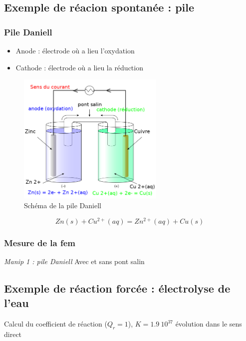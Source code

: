 \documentclass{article}%
\begin{document}
\subsection{Exemple de réacion spontanée : pile}

\subsubsection{Pile Daniell}


\begin{itemize}
	\item Anode : électrode où a lieu l'oxydation

	\item Cathode : électrode où a lieu la réduction
\end{itemize}

\begin{figure}
	\centerline{\includegraphics[width=7cm]{images/pile_Daniell.png}}
	\caption{Schéma de la pile Daniell}
\end{figure}

\[Zn(s) + Cu^{2+}(aq) = Zn^{2+}(aq) + Cu(s)\]

\subsubsection{Mesure de la fem}
\textit{Manip 1 : pile Daniell}
Avec et sans pont salin
\subsection{Exemple de réaction forcée : électrolyse de l’eau}
Calcul du coefficient de réaction ($Q_r=1$), $K=1.9~10^{37}$ évolution dans le sens direct
\end{document}
